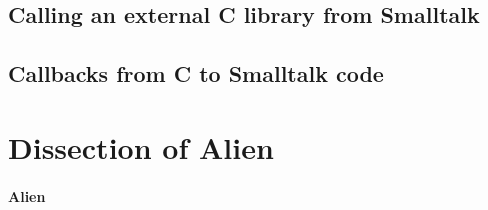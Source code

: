 \documentclass[a4paper,10pt,twoside]{book}
\begin{document}
\subsection{Calling an external C library from Smalltalk} \label{sec:calling_an_external_c_library_from_smalltalk} %


\subsection{Callbacks from C to Smalltalk code} \label{sec:callbacks_from_c_to_smalltalk_code} %





\section{Dissection of Alien} \label{sec:dissection_of_alien} %


\paragraph{Alien}
% 
% 
% 
% 
% 	
\end{document}
